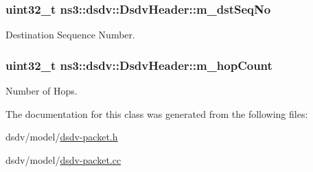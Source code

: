 \subsubsection[{\texorpdfstring{m\+\_\+dst\+Seq\+No}{m_dstSeqNo}}]{\setlength{\rightskip}{0pt plus 5cm}uint32\+\_\+t ns3\+::dsdv\+::\+Dsdv\+Header\+::m\+\_\+dst\+Seq\+No\hspace{0.3cm}{\ttfamily [private]}}\hypertarget{classns3_1_1dsdv_1_1DsdvHeader_aa2c81a2f81c22a8148a7daeb8c0d757c}{}\label{classns3_1_1dsdv_1_1DsdvHeader_aa2c81a2f81c22a8148a7daeb8c0d757c}


Destination Sequence Number. 

\subsubsection[{\texorpdfstring{m\+\_\+hop\+Count}{m_hopCount}}]{\setlength{\rightskip}{0pt plus 5cm}uint32\+\_\+t ns3\+::dsdv\+::\+Dsdv\+Header\+::m\+\_\+hop\+Count\hspace{0.3cm}{\ttfamily [private]}}\hypertarget{classns3_1_1dsdv_1_1DsdvHeader_a0dfed4a5a4e57f4bc8604c036826332e}{}\label{classns3_1_1dsdv_1_1DsdvHeader_a0dfed4a5a4e57f4bc8604c036826332e}


Number of Hops. 



The documentation for this class was generated from the following files\+:\begin{DoxyCompactItemize}
\item 
dsdv/model/\hyperlink{dsdv-packet_8h}{dsdv-\/packet.\+h}\item 
dsdv/model/\hyperlink{dsdv-packet_8cc}{dsdv-\/packet.\+cc}\end{DoxyCompactItemize}
